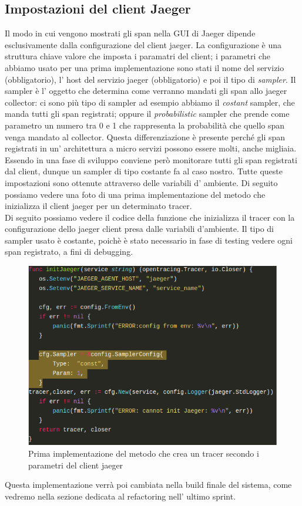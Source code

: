 \documentclass[a4paper,12pt,titlepage,italian,openany]{report}
\begin{document}
\subsection{Impostazioni del client Jaeger}
Il modo in cui vengono mostrati gli span nella GUI di Jaeger dipende esclusivamente dalla configurazione del client jaeger.
La configurazione è una struttura chiave valore che imposta i paramatri del client; i parametri che abbiamo usato per una prima implementazione sono stati il nome del servizio (obbligatorio), l' host del servizio jaeger (obbligatorio) e poi il tipo di \textit{sampler}. Il sampler è l' oggetto che determina come verranno mandati gli span allo jaeger collector:
ci sono più tipo di sampler ad esempio abbiamo il \textit{costant} sampler, che manda tutti gli span registrati; oppure il \textit{probabilistic} sampler che prende come parametro un numero tra 0 e 1 che rappresenta la probabilità che quello span venga mandato al collector. Questa differenziazione è presente perché gli span registrati in un' architettura a micro servizi possono essere molti, anche migliaia. Essendo in una fase di sviluppo conviene però monitorare tutti gli span registrati dal client, dunque un sampler di tipo costante fa al caso nostro.
Tutte queste impostazioni sono ottenute attraverso delle variabili d' ambiente. Di seguito possiamo vedere una foto di una prima implementazione del metodo che inizializza il client jaeger per un determinato tracer.
\\ Di seguito possiamo vedere il codice della funzione che inizializza il tracer con la configurazione dello jaeger client presa dalle variabili d'ambiente.
Il tipo di sampler usato è costante, poichè è stato necessario in fase di testing vedere ogni span registrato, a fini di debugging.
\begin{figure}[H]
    \includegraphics[scale=0.5]{92.png}
    \centering
    \caption{Prima implementazione del metodo che crea un tracer secondo i parametri del client jaeger}
\end{figure}
Questa implementazione verrà poi cambiata nella build finale del sistema, come vedremo nella sezione dedicata al refactoring nell' ultimo sprint.
\end{document}
